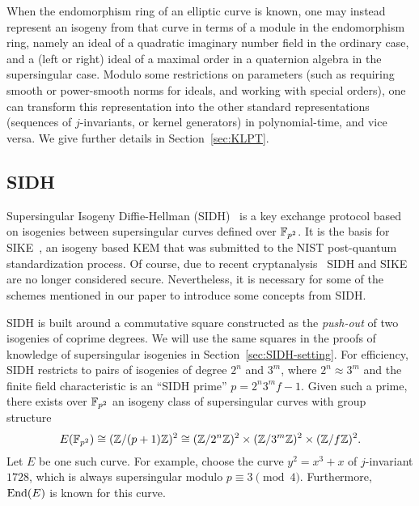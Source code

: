 When the endomorphism ring of an elliptic curve is known, one may instead represent an isogeny from that curve in terms of a module in the endomorphism ring, namely an ideal of a quadratic imaginary number field in the ordinary case, and a (left or right) ideal of a maximal order in a quaternion algebra in the supersingular case.
%
Modulo some restrictions on parameters (such as requiring smooth or power-smooth norms for ideals, and working with special orders), one can transform this representation into the other standard representations (sequences of $j$-invariants, or kernel generators) in polynomial-time, and vice versa. We give further details in Section~\ref{sec:KLPT}.







\subsection{SIDH}\label{sec:SIDH}

Supersingular Isogeny Diffie-Hellman (SIDH)~\cite{JDF11,DFJP14} is a key exchange protocol based on isogenies between supersingular curves defined over $\mathbb{F}_{p^2}$.
It is the basis for SIKE~\cite{sike2017}, an isogeny based KEM that was submitted to the NIST post-quantum standardization process.
Of course, due to recent cryptanalysis~\cite{CD22,MM22,Rob22} SIDH and SIKE are no longer considered secure.
Nevertheless, it is necessary for some of the schemes mentioned in our paper to introduce some concepts from SIDH.

SIDH is built around a commutative square constructed as the \emph{push-out} of two isogenies of coprime degrees.
We will use the same squares in the proofs of knowledge of supersingular isogenies in Section~\ref{sec:SIDH-setting}.
For efficiency, SIDH restricts to pairs of isogenies of degree $2^{n}$ and $3^{m}$, where $2^{n} \approx 3^{m}$ and the finite field characteristic is an ``SIDH prime'' $p = 2^{n}  3^{m} f - 1 $.
%
Given such a prime, there exists over $\mathbb{F}_{p^2}$ an isogeny class of supersingular curves with group structure
\[
   E(\mathbb{F}_{p^2}) \cong (\mathbb{Z} /(p + 1)\mathbb{Z})^2 \cong (\mathbb{Z} /2^n\mathbb{Z})^2 \times (\mathbb{Z} / 3^m \mathbb{Z})^2 \times (\mathbb{Z} / f \mathbb{Z})^2.
\]
Let $E$ be one such curve. For example, choose the curve $y^2 = x^3 + x$ of $j$-invariant $1728$, which is always supersingular modulo  $p \equiv 3 \pmod{4}$. Furthermore, $\text{End}(E)$ is known for this curve.

